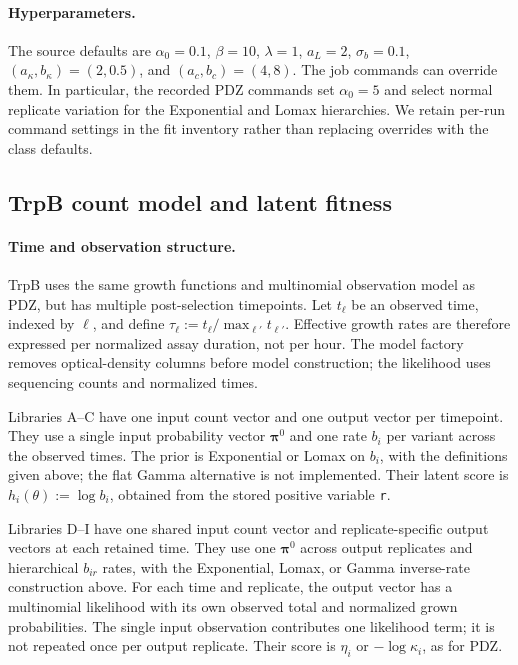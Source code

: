 \paragraph{Hyperparameters.}
The source defaults are $\alpha_0=0.1$, $\beta=10$, $\lambda=1$,
$a_L=2$, $\sigma_b=0.1$, $(a_\kappa,b_\kappa)=(2,0.5)$, and
$(a_c,b_c)=(4,8)$. The job commands can override them. In particular,
the recorded PDZ commands set $\alpha_0=5$ and select normal replicate
variation for the Exponential and Lomax hierarchies. We retain per-run
command settings in the fit inventory rather than replacing overrides with
the class defaults.

\subsection{TrpB count model and latent fitness}
\label{app:trpb-model}

\paragraph{Time and observation structure.}
TrpB uses the same growth functions and multinomial observation model as
PDZ, but has multiple post-selection timepoints. Let $t_\ell$ be an
observed time, indexed by $\ell$, and define
$\tau_\ell:=t_\ell/\max_{\ell'}t_{\ell'}$. Effective growth rates are
therefore expressed per normalized assay duration, not per hour. The model
factory removes optical-density columns before model construction; the
likelihood uses sequencing counts and normalized times.

Libraries A--C have one input count vector and one output vector per timepoint.
They use a single input probability vector $\boldsymbol\pi^0$ and one rate
$b_i$ per variant across the observed times. The prior is Exponential or
Lomax on $b_i$, with the definitions given above; the flat Gamma alternative
is not implemented. Their latent score is $h_i(\theta):=\log b_i$, obtained
from the stored positive variable \texttt{r}.

Libraries D--I have one shared input count vector and replicate-specific
output vectors at each retained time. They use one
$\boldsymbol\pi^0$ across output replicates and hierarchical $b_{ir}$
rates, with the Exponential, Lomax, or Gamma inverse-rate construction
above. For each time and replicate, the output vector has a multinomial
likelihood with its own observed total and normalized grown probabilities.
The single input observation contributes one likelihood term; it is not
repeated once per output replicate. Their score is $\eta_i$ or
$-\log\kappa_i$, as for PDZ.


